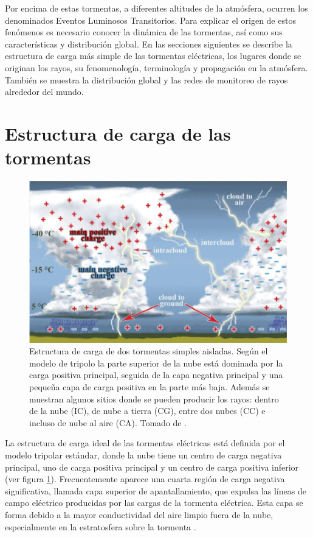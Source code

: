 \documentclass[12pt,oneside,openany,letter]{book}
\begin{document}
Por encima de estas tormentas, a diferentes altitudes de la atmósfera, ocurren los denominados Eventos Luminosos Transitorios. Para explicar el origen de estos fenómenos es necesario conocer la dinámica de las tormentas, así como sus características y distribución global. En las secciones siguientes se describe la estructura de carga más simple de las tormentas eléctricas, los lugares donde se originan los rayos, su fenomenología, terminología y propagación en la atmósfera. También se muestra la distribución global y las redes de monitoreo de rayos alrededor del mundo.  

\section{Estructura de carga de las tormentas}
\begin{figure}
    \centering
    \includegraphics[scale=0.62]{figures/tormenta_modelo.png}
    \caption[Estructura de carga según el modelo de tripolo.]{Estructura de carga de dos tormentas simples aisladas. Según el modelo de tripolo la parte superior de la nube está dominada por la carga positiva principal, seguida de la capa negativa principal y una pequeña capa de carga positiva en la parte más baja. Además se muestran algunos sitios donde se pueden producir los rayos: dentro de la nube (IC), de nube a tierra (CG), entre dos nubes (CC) e incluso de nube al aire (CA). Tomado de \cite{DwyerUman2014}.}
    \label{fig:tormenta_modelo}
\end{figure}

La estructura de carga ideal de las tormentas eléctricas está definida por el modelo tripolar estándar, donde la nube tiene un centro de carga negativa principal, uno de carga positiva principal y un centro de carga positiva inferior (ver figura \ref{fig:tormenta_modelo}). Frecuentemente aparece una cuarta región de carga negativa significativa, llamada capa superior de apantallamiento, que expulsa las líneas de campo eléctrico producidas por las cargas de la tormenta eléctrica. Esta capa se forma debido a la mayor conductividad del aire limpio fuera de la nube, especialmente en la estratosfera sobre la tormenta \cite{DwyerUman2014}. 
\end{document}
